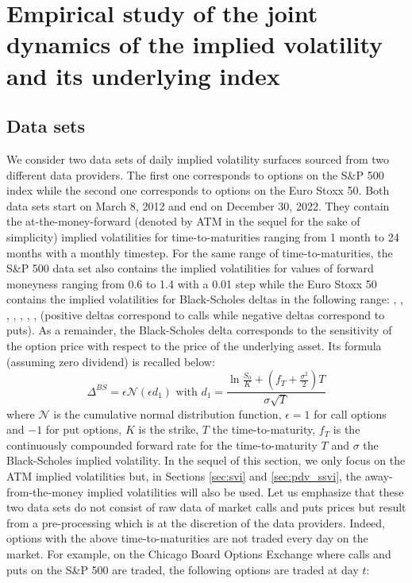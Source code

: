 \section{Empirical study of the joint dynamics of the implied volatility and its underlying index}\label{sec:empirical_study}

\subsection{Data sets}\label{sec:data}
We consider two data sets of daily implied volatility surfaces sourced from two different data providers. The first one corresponds to options on the S\&P 500 index while the second one corresponds to options on the Euro Stoxx 50. Both data sets start on March 8, 2012 and end on December 30, 2022. They contain the at-the-money-forward (denoted by ATM in the sequel for the sake of simplicity) implied volatilities for time-to-maturities ranging from 1 month to 24 months with a monthly timestep. For the same range of time-to-maturities, the S\&P 500 data set also contains the implied volatilities for values of forward moneyness ranging from 0.6 to 1.4 with a 0.01 step while the Euro Stoxx 50 contains the implied volatilities for Black-Scholes deltas in the following range: , , , , , , ,  (positive deltas correspond to calls while negative deltas correspond to puts). As a remainder, the Black-Scholes delta corresponds to the sensitivity of the option price with respect to the price of the underlying asset. Its formula  (assuming zero dividend) is recalled below:
\begin{equation}\label{eq:delta_formula}
    \Delta^{BS} = \epsilon\mathcal{N}(\epsilon d_1) \text{ with } d_1 = \frac{\ln\frac{S_0}{K}+(f_T+\frac{\sigma^2}{2})T}{\sigma \sqrt{T}}
\end{equation}
where $\mathcal{N}$ is the cumulative normal distribution function, $\epsilon=1$ for call options and $-1$ for put options, $K$ is the strike, $T$ the time-to-maturity, {$f_T$ is the continuously compounded forward rate for the time-to-maturity $T$} and $\sigma$ the Black-Scholes implied volatility. In the sequel of this section, we only focus on the ATM implied volatilities but, in Sections \ref{sec:svi} and \ref{sec:pdv_ssvi}, the away-from-the-money implied volatilities will also be used. Let us emphasize that these two data sets do not consist of raw data of market calls and puts prices but result from a pre-processing which is at the discretion of the data providers. Indeed, options with the above time-to-maturities are not traded every day on the market. For example, on the Chicago Board Options Exchange where calls and puts on the S\&P 500 are traded, the following options are traded at day $t$:
